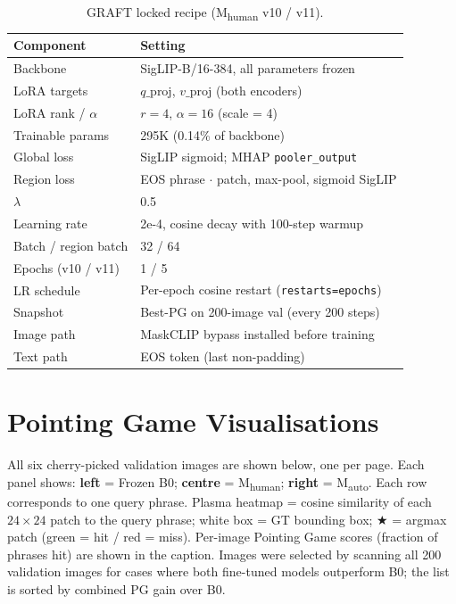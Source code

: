 \documentclass{article}
\begin{document}
\begin{table}[H]
\centering
\caption{GRAFT locked recipe (M\textsubscript{human} v10 / v11).}
\begin{tabular}{ll}
\toprule
Component & Setting \\
\midrule
Backbone & SigLIP-B/16-384, all parameters frozen \\
LoRA targets & $q\_\text{proj}$, $v\_\text{proj}$ (both encoders) \\
LoRA rank / $\alpha$ & $r=4$, $\alpha=16$ (scale = 4) \\
Trainable params & 295K (0.14\% of backbone) \\
Global loss & SigLIP sigmoid; MHAP \texttt{pooler\_output} \\
Region loss & EOS phrase $\cdot$ patch, max-pool, sigmoid SigLIP \\
$\lambda$ & 0.5 \\
Learning rate & 2e-4, cosine decay with 100-step warmup \\
Batch / region batch & 32 / 64 \\
Epochs (v10 / v11) & 1 / 5 \\
LR schedule & Per-epoch cosine restart (\texttt{restarts=epochs}) \\
Snapshot & Best-PG on 200-image val (every 200 steps) \\
Image path & MaskCLIP bypass installed before training \\
Text path & EOS token (last non-padding) \\
\bottomrule
\end{tabular}
\end{table}

\FloatBarrier
\section{Pointing Game Visualisations}
\label{app:viz}

All six cherry-picked validation images are shown below, one per page.
Each panel shows: \textbf{left} = Frozen B0; \textbf{centre} = M\textsubscript{human};
\textbf{right} = M\textsubscript{auto}.  Each row corresponds to one query
phrase.  Plasma heatmap = cosine similarity of each $24{\times}24$ patch
to the query phrase; white box = GT bounding box; $\bigstar$ = argmax patch
({\color{green!60!black}green} = hit / {\color{red}red} = miss).
Per-image Pointing Game scores (fraction of phrases hit) are shown in the
caption.  Images were selected by scanning all 200 validation images for
cases where both fine-tuned models outperform B0; the list is sorted by
combined PG gain over B0.
\end{document}
